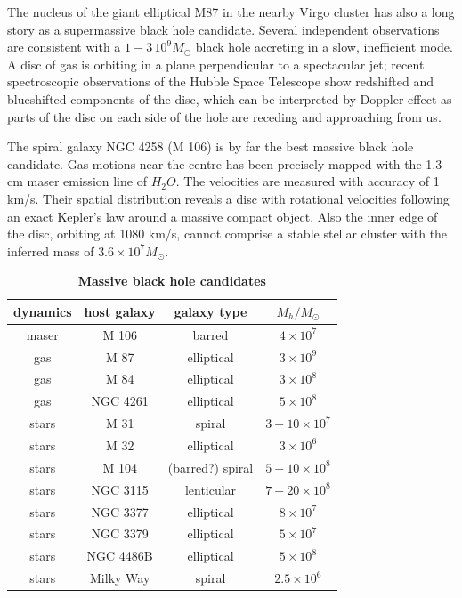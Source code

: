 \documentclass[12pt]{article}
\begin{document}
The nucleus of the giant elliptical M87 in the nearby Virgo cluster has also a long 
story as a supermassive black hole candidate. Several independent 
observations are consistent with a $1-3 \, 10^{9} M_{\odot}$ black hole 
accreting in a slow, inefficient mode. A disc of gas is orbiting in a 
plane perpendicular to a spectacular jet; recent spectroscopic 
observations of the Hubble Space Telescope show redshifted and 
blueshifted components of the disc, which can be interpreted by Doppler effect as parts 
of the disc on each side of the hole are receding and approaching from us. 

The spiral galaxy NGC 4258 (M 106) is by far the best massive black hole 
candidate. Gas motions near the centre has been precisely mapped with 
the 1.3 cm maser emission line of $H_{2}O$. The velocities are 
measured with accuracy of 1 km/s. Their spatial distribution reveals a 
disc with rotational velocities following an exact Kepler's law around 
a massive compact object. Also the inner edge of the disc, orbiting at 
1080 km/s, cannot comprise a stable stellar cluster with the 
inferred mass of $3.6 \times 10^{7}M_{\odot}$.

 \begin{table}
\caption{\label{luminet:BB}
{\bf Massive black hole candidates}}
\begin{center}
\vspace{1.cm}
\begin{tabular}{|c|c|c|c|}
\hline
dynamics      & host galaxy & galaxy type & $M_{h}/M_{\odot}$     \\ \hline

maser     & M 106     &  barred            & $ 4 \times 10^{7}$  \\
gas       & M 87      &  elliptical        & $ 3 \times 10^{9}$ \\
gas       & M 84      & elliptical         & $ 3 \times 10^{8}$ \\
gas       & NGC 4261  & elliptical         & $ 5 \times 10^{8}$ \\           \hline
stars     & M 31      & spiral             & $3-10 \times10^{7}$  \\ 
stars     & M 32      & elliptical         & $ 3 \times 10^{6}$ \\
stars     & M 104     & (barred?) spiral   & $ 5-10 \times 10^{8}$  \\
stars     & NGC 3115  & lenticular         & $ 7-20 \times 10^{8}$\\
stars     & NGC 3377  & elliptical         & $ 8 \times 10^{7}$\\
stars     & NGC 3379  & elliptical         & $ 5 \times 10^{7}$\\
stars     & NGC 4486B & elliptical         & $ 5 \times 10^{8}$\\
stars     & Milky Way & spiral             & $ 2.5 \times 10^{6}$\\
\hline
\end{tabular}
\end{center}
\end{table}
\end{document}
